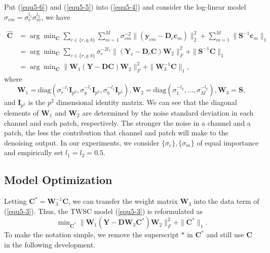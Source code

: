 Put (\ref{equ5-6}) and (\ref{equ5-5}) into (\ref{equ5-4}) and consider the log-linear model $\sigma_{cm}=\sigma_{c}^{l_{1}}\sigma_{m}^{l_{2}}$, we have

\begin{equation}
\label{equ5-7}
\begin{split}
\hat{\bm{C}}
&
=
\arg\min\nolimits_{\bm{C}}
\sum\nolimits_{c\in\{r, g, b\}}
\sum\nolimits_{m=1}^{M}
\sigma_{cm}^{-2}
\|(\bm{y}_{cm}-\bm{D}_{c}\bm{c}_{m})\|_{2}^{2}
+
\sum\nolimits_{m=1}^{M}
\|\bm{S}^{-1}\bm{c}_{m}\|_{1}
\\
&
=
\arg\min\nolimits_{\bm{C}}
\sum\nolimits_{c\in\{r, g, b\}}
\sigma_{c}^{-2l_{1}}
\|(\bm{Y}_{c}-\bm{D}_{c}\bm{C})\bm{W}_{2}\|_{F}^{2}+\|\bm{S}^{-1}\bm{C}\|_{1}
\\
&
=
\arg\min\nolimits_{\bm{C}}\|\bm{W}_{1}(\bm{Y}-\bm{D}\bm{C})\bm{W}_{2}\|_{F}^{2}+\|\bm{W}_{3}^{-1}\bm{C}\|_{1},
\end{split}
\end{equation}
where
\begin{equation}
\label{equ5-8}
\bm{W}_{1}
=
\text{diag}(\sigma_{r}^{-l_{1}}\bm{I}_{p^2},\sigma_{g}^{-l_{1}}\bm{I}_{p^2},\sigma_{b}^{-l_{1}}\bm{I}_{p^2})
,
\bm{W}_{2}
=
\text{diag}(\sigma_{1}^{-l_{2}},...,\sigma_{M}^{-l_{2}})
,
\bm{W}_{3} 
= 
\bm{S}
,
\end{equation}
and $\bm{I}_{p^2}$ is the $p^{2}$ dimensional identity matrix. We can see that the diagonal elements of $\bm{W}_{1}$ and $\bm{W}_{2}$ are determined by the noise standard deviation in each channel and each patch, respectively. The stronger the noise in a channel and a patch, the less the contribution that channel and patch will make to the denoising output. In our experiments, we consider $\{\sigma_{c}\}, \{\sigma_{m}\}$ of equal importance and empirically set $l_{1}=l_{2}=0.5$.



\subsection{Model Optimization}

Letting $\bm{C}^{*}=\bm{W}_{3}^{-1}\bm{C}$, we can transfer the weight matrix $\bm{W}_{3}$ into the data term of (\ref{equ5-3}). Thus, the TWSC model (\ref{equ5-3}) is reformulated as 
\begin{equation}
\label{equ5-9}
\min\nolimits_{\bm{C}^{*}}\|\bm{W}_{1}(\bm{Y}-\bm{D}\bm{W}_{3}\bm{C}^{*})\bm{W}_{2}\|_{F}^{2}
+
\|\bm{C}^{*}\|_{1}.
\end{equation}
To make the notation simple, we remove the superscript $*$ in $\bm{C}^{*}$ and still use $\bm{C}$ in the following development.

